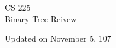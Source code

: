 \documentclass[11pt, letterpaper]{article}
\theoremstyle{definition}
\theoremstyle{theorem}
\begin{document}
  \begin{titlepage}
    {\LARGE CS 225} \\ 
    {\large Binary Tree Reivew}
    \begin{multicols}{3}
      \tableofcontents
    \end{multicols}
    \vfill 
    Updated on November 5, 107
  \end{titlepage}
  
  \begin{multicols}{3}
    
    
    
    
  \end{multicols}
\end{document}
